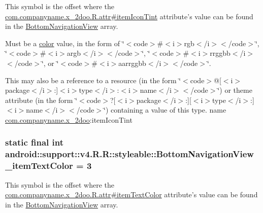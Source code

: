 This symbol is the offset where the \hyperlink{classcom_1_1companyname_1_1x__2doo_1_1_r_1_1attr_d180f97cceb2f27d8105134eeb91445f}{com.companyname.x\_\-2doo.R.attr\#itemIconTint} attribute's value can be found in the \hyperlink{classandroid_1_1support_1_1v4_1_1_r_1_1styleable_731fa193e6e8634aff724fecf9d4f640}{BottomNavigationView} array.

Must be a \hyperlink{classandroid_1_1support_1_1v4_1_1_r_1_1color}{color} value, in the form of \char`\"{}$<$code$>$\#$<$i$>$rgb$<$/i$>$$<$/code$>$\char`\"{}, \char`\"{}$<$code$>$\#$<$i$>$argb$<$/i$>$$<$/code$>$\char`\"{}, \char`\"{}$<$code$>$\#$<$i$>$rrggbb$<$/i$>$$<$/code$>$\char`\"{}, or \char`\"{}$<$code$>$\#$<$i$>$aarrggbb$<$/i$>$$<$/code$>$\char`\"{}. 

This may also be a reference to a resource (in the form \char`\"{}$<$code$>$@\mbox{[}$<$i$>$package$<$/i$>$:\mbox{]}$<$i$>$type$<$/i$>$:$<$i$>$name$<$/i$>$$<$/code$>$\char`\"{}) or theme attribute (in the form \char`\"{}$<$code$>$?\mbox{[}$<$i$>$package$<$/i$>$:\mbox{]}\mbox{[}$<$i$>$type$<$/i$>$:\mbox{]}$<$i$>$name$<$/i$>$$<$/code$>$\char`\"{}) containing a value of this type.  name \hyperlink{namespacecom_1_1companyname_1_1x__2doo}{com.companyname.x\_\-2doo}:itemIconTint \hypertarget{classandroid_1_1support_1_1v4_1_1_r_1_1styleable_587ccbdac026a0e313be585abff19ab0}{
\subsubsection[{BottomNavigationView\_\-itemTextColor}]{\setlength{\rightskip}{0pt plus 5cm}static final int android::support::v4.R.R::styleable::BottomNavigationView\_\-itemTextColor = 3}}
\label{classandroid_1_1support_1_1v4_1_1_r_1_1styleable_587ccbdac026a0e313be585abff19ab0}


This symbol is the offset where the \hyperlink{classcom_1_1companyname_1_1x__2doo_1_1_r_1_1attr_6d1d4faf528fcb60014cc0da91efab94}{com.companyname.x\_\-2doo.R.attr\#itemTextColor} attribute's value can be found in the \hyperlink{classandroid_1_1support_1_1v4_1_1_r_1_1styleable_731fa193e6e8634aff724fecf9d4f640}{BottomNavigationView} array.

